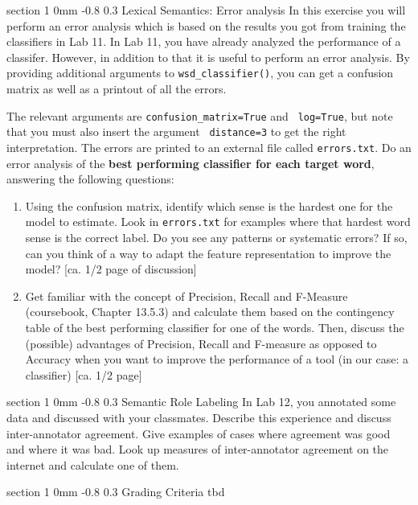 \documentclass[11pt]{article}
\makeatletter
\newcommand{\newsec}[1]{\section{#1}\noindent}
\renewcommand{\section}{\@startsection
{section}%
{1}%
{0mm}%
{-0.8\baselineskip}%
{0.3\baselineskip}%
{\bfseries\large}}%
\makeatother
\begin{document}
\newsec{Lexical Semantics: Error analysis}%
In this exercise you will perform an error analysis which is based on
the results you got from training the classifiers in Lab 11.  In Lab
11, you have already analyzed the performance of a classifer. However,
in addition to that it is useful to perform an error analysis. By
providing additional arguments to {\tt wsd\_classifier()}, you can get
a confusion matrix as well as a printout of all the errors.
\begin{center}
\fbox{
\scalebox{0.55}{

}}
\end{center}
The relevant arguments are {\tt confusion\_matrix=True} and {\tt
  log=True}, but note that you must also insert the argument {\tt
  distance=3} to get the right interpretation. The errors are printed
to an external file called {\tt errors.txt}. Do an error analysis of
the \textbf{best performing classifier for each target word}, answering the
following questions:
\begin{enumerate}
\item Using the confusion matrix, identify which sense is the hardest
  one for the model to estimate. Look in {\tt errors.txt} for examples
  where that hardest word sense is the correct label.  Do you see any
  patterns or systematic errors? If so, can you think of a way to
  adapt the feature representation to improve the model?
  \textcolor{UUred}{[ca. 1/2 page of discussion]}
\item Get familiar with the concept of Precision, Recall and F-Measure (coursebook, Chapter 13.5.3) and calculate them based on the contingency table of the best performing classifier for one of the words. Then, discuss the (possible) advantages of Precision, Recall and F-measure as opposed to Accuracy when you want to improve the performance of a tool (in our case: a classifier) \textcolor{UUred}{[ca. 1/2 page]}
\end{enumerate}


\newsec{Semantic Role Labeling}%
In Lab 12, you annotated some data and discussed with your classmates.
Describe this experience and discuss inter-annotator agreement.
Give examples of cases where agreement was good and where it was bad.
Look up measures of inter-annotator agreement on the internet and calculate one of them.

\section{Grading Criteria}
tbd
\end{document}
